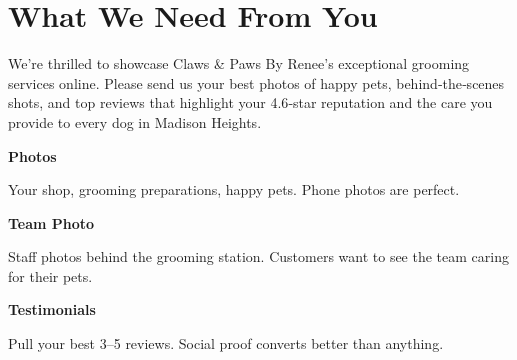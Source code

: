 \documentclass[11pt,letterpaper]{article}
\begin{document}
\vspace{0.2em}

\section*{What We Need From You}

We’re thrilled to showcase Claws \& Paws By Renee’s exceptional grooming services online. Please send us your best photos of happy pets, behind‑the‑scenes shots, and top reviews that highlight your 4.6‑star reputation and the care you provide to every dog in Madison Heights.

\vspace{0.12em}

\noindent\begin{minipage}[t]{0.48\textwidth}
\begin{tcolorbox}[colframe=accent-teal, boxrule=1pt, left=0.7em, right=0.7em, top=0.5em, bottom=0.5em, arc=4pt, boxsep=0pt]
{\bfseries\small\color{accent-teal}Photos}

\vspace{0.15em}

{\small Your shop, grooming preparations, happy pets. Phone photos are perfect.}
\end{tcolorbox}

\vspace{0.1em}

\begin{tcolorbox}[colframe=accent-teal, boxrule=1pt, left=0.7em, right=0.7em, top=0.5em, bottom=0.5em, arc=4pt, boxsep=0pt]
{\bfseries\small\color{accent-teal}Team Photo}

\vspace{0.15em}

{\small Staff photos behind the grooming station. Customers want to see the team caring for their pets.}
\end{tcolorbox}

\vspace{0.1em}

\begin{tcolorbox}[colframe=accent-teal, boxrule=1pt, left=0.7em, right=0.7em, top=0.5em, bottom=0.5em, arc=4pt, boxsep=0pt]
{\bfseries\small\color{accent-teal}Testimonials}

\vspace{0.15em}

{\small Pull your best 3--5 reviews. Social proof converts better than anything.}
\end{tcolorbox}
\end{minipage}
\end{document}
